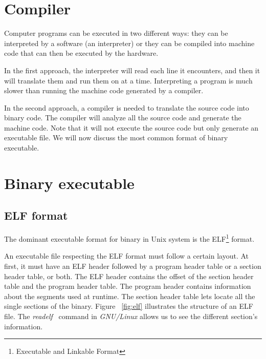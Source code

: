 \documentclass[a4paper,11pt,oneside]{report}
\begin{document}
\section{Compiler}
Computer programs can be executed in two different ways: they can be interpreted
by a software (an interpreter) or they can be compiled into machine code that can
then be executed by the hardware. 


In the first approach, the interpreter will read each line it encounters, and
then it will translate them and run them on at a time. Interpreting a program
is much slower than running the machine code generated by a compiler.

In the second approach, a compiler is needed to translate the source code into binary code.
The compiler will analyze all the source code and generate the machine code.
Note that it will not execute the source code but only generate an executable file.
We will now discuss the most common format of binary executable.


\section{Binary executable}
\subsection{ELF format}
%
The dominant executable format for binary in Unix system is the ELF\footnote{Executable
and Linkable Format} format. 

An executable file respecting the ELF format must follow a certain layout. At
first, it must have an ELF header followed by a program header table or a section
header table, or both. 
The ELF header contains the offset of the section header table and the program
header table. The program header contains information about the segments used
at runtime. The section header table lets locate all the single sections of the
binary. Figure ~\ref{fig:elf} illustrates the structure of an ELF file. The
\textit{readelf}~\cite{readelfMan} command in \textit{GNU/Linux}
allows us to see the different section's information.
\end{document}

